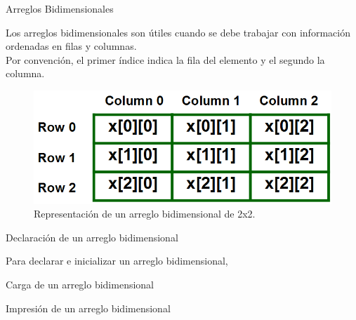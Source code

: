 \documentclass[xcolor=pdftex,table,11pt]{beamer}
\begin{document}
\begin{frame}{Arreglos Bidimensionales}
\begin{block}{}
Los arreglos bidimensionales son útiles cuando se debe trabajar con información ordenadas en filas y columnas.\\
Por convención, el primer índice indica la fila del elemento y el segundo la columna.
\end{block}

\begin{figure}
 \centering
\includegraphics[scale=0.5]{../img/exported/matrix.png}
\caption{Representación de un arreglo bidimensional de 2x2.}
\end{figure}

\end{frame}


\begin{frame}{Declaración de un arreglo bidimensional}

\codesetstylefrombeamer
{}
\vspace{0.5cm}
\vspace{0.5cm}
Para declarar e inicializar un arreglo bidimensional, 
\codesetstylefrombeamer
{}


\end{frame}

\begin{frame}{Carga de un arreglo bidimensional}
\codesetstylefrombeamer
{}
\end{frame}

\begin{frame}{Impresión de un arreglo bidimensional}
\codesetstylefrombeamer
{}


\href{https://github.com/danis963/informaticaI_IUA/blob/main/c/src/8-array_2d_load_print.c}{}
\end{frame}
\end{document}

